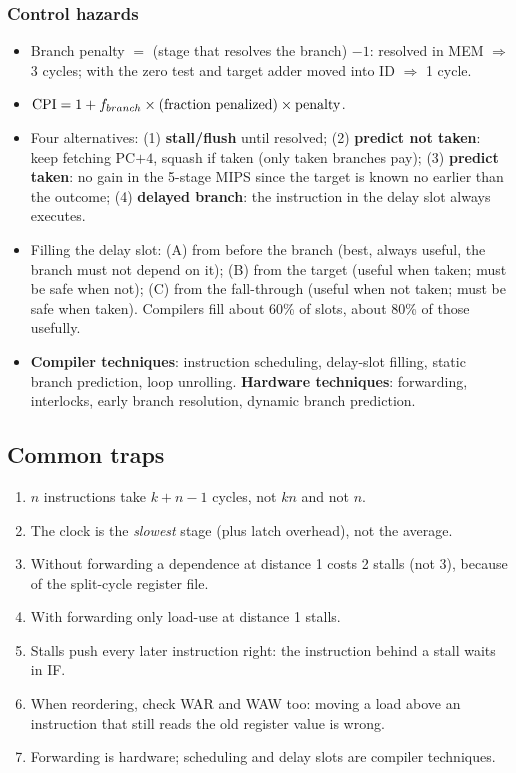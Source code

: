 \subsubsection{Control hazards}
\begin{itemize}[leftmargin=*]
  \item Branch penalty $=$ (stage that resolves the branch) $-1$: resolved in MEM
  $\Rightarrow$ 3 cycles; with the zero test and target adder moved into ID
  $\Rightarrow$ 1 cycle.
  \item $\mathrm{CPI}=1+f_{branch}\times(\text{fraction penalized})\times\text{penalty}$.
  \item Four alternatives: (1) \textbf{stall/flush} until resolved; (2)
  \textbf{predict not taken}: keep fetching PC$+4$, squash if taken (only taken
  branches pay); (3) \textbf{predict taken}: no gain in the 5-stage MIPS since the
  target is known no earlier than the outcome; (4) \textbf{delayed branch}: the
  instruction in the delay slot always executes.
  \item Filling the delay slot: (A) from before the branch (best, always useful,
  the branch must not depend on it); (B) from the target (useful when taken; must
  be safe when not); (C) from the fall-through (useful when not taken; must be safe
  when taken). Compilers fill about 60\% of slots, about 80\% of those usefully.
  \item \textbf{Compiler techniques}: instruction scheduling, delay-slot filling,
  static branch prediction, loop unrolling. \textbf{Hardware techniques}:
  forwarding, interlocks, early branch resolution, dynamic branch prediction.
\end{itemize}

\subsection{Common traps}
\begin{enumerate}[leftmargin=*]
  \item $n$ instructions take $k+n-1$ cycles, not $kn$ and not $n$.
  \item The clock is the \emph{slowest} stage (plus latch overhead), not the average.
  \item Without forwarding a dependence at distance 1 costs 2 stalls (not 3),
  because of the split-cycle register file.
  \item With forwarding only load-use at distance 1 stalls.
  \item Stalls push every later instruction right: the instruction behind a stall
  waits in IF.
  \item When reordering, check WAR and WAW too: moving a load above an instruction
  that still reads the old register value is wrong.
  \item Forwarding is hardware; scheduling and delay slots are compiler techniques.
\end{enumerate}

